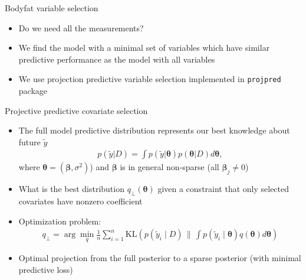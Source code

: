 \documentclass[english,t]{beamer}
\newcommand{\KLx}[2] { \mathrm{KL} {\left(#1 \, \| \, #2\right)} }
\newcommand{\vs}[1] { \boldsymbol{#1} }
\begin{document}
\begin{frame}
  
  {\Large\color{navyblue} Bodyfat variable selection}

  \begin{itemize}
  \item<1-> Do we need all the measurements?
  \item<1-> We find the model with a minimal set of variables which have similar predictive performance as the model with all variables
  \item<2-> We use projection predictive variable selection
    implemented in {\tt projpred} package
\end{itemize}
\end{frame}

\begin{frame}

  {\Large\color{navyblue} {Projective predictive covariate selection}}
    
\begin{itemize}
\item The full model predictive distribution represents our best knowledge about future $\tilde{y}$
	\begin{align*}
          p(\tilde{y} | D) = \int p(\tilde{y} | \vs\theta) p(\vs \theta| D) d\vs\theta,
        \end{align*}
        where $\vs \theta=(\vs \beta,\sigma^2)$) and $\vs \beta$ is in general non-sparse (all $\vs\beta_j \ne 0$)
	\item What is the best distribution $q_\perp(\vs \theta)$ given a
          constraint that only selected covariates have nonzero coefficient
	\item Optimization problem:
	\begin{align*}
		q_\perp = \arg \min_{q} \frac{1}{n} \sum_{i=1}^n 
			\KLx{p(\tilde{y}_i \mid D)}{\int p(\tilde{y}_i \mid \vs \theta) q(\vs \theta) d\vs\theta}%
	\end{align*}
      \item Optimal projection from the full posterior to a sparse
        posterior (with minimal predictive loss)
\end{itemize}

\end{frame}
\end{document}
